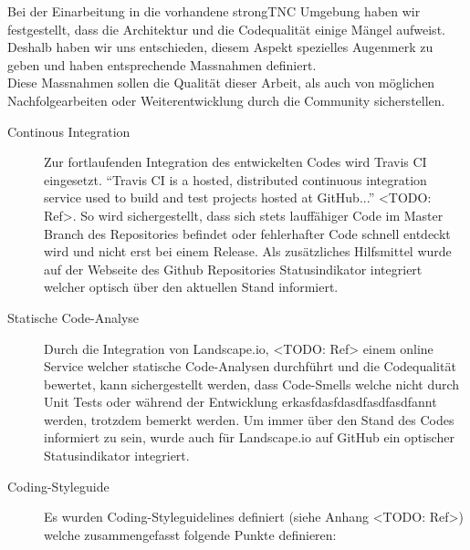 Bei der Einarbeitung in die vorhandene strongTNC Umgebung haben wir
festgestellt, dass die Architektur und die Codequalität einige Mängel aufweist.
Deshalb haben wir uns entschieden, diesem Aspekt spezielles Augenmerk zu geben
und haben entsprechende Massnahmen definiert.\\ 
Diese Massnahmen sollen die Qualität dieser Arbeit, als auch von möglichen
Nachfolgearbeiten oder Weiterentwicklung durch die Community sicherstellen.

\begin{description}
	\item[Continous Integration] Zur fortlaufenden Integration des entwickelten
	Codes wird Travis CI eingesetzt. \enquote{Travis CI is a hosted, distributed
	continuous integration service used to build and test projects hosted at
	GitHub...} <TODO: Ref>. So wird sichergestellt, dass sich stets lauffähiger Code
	im Master Branch des Repositories befindet oder fehlerhafter Code schnell
	entdeckt wird und nicht erst bei einem Release. Als zusätzliches Hilfsmittel
	wurde auf der Webseite des Github Repositories Statusindikator integriert
	welcher optisch über den aktuellen Stand informiert.

	\item[Statische Code-Analyse] Durch die Integration von Landscape.io, <TODO:
	Ref> einem online Service welcher statische Code-Analysen durchführt und die
	Codequalität bewertet, kann sichergestellt werden, dass Code-Smells welche
	nicht durch Unit Tests oder während der Entwicklung erkasfdasfdasdfasdfasdfannt
	werden, trotzdem bemerkt werden. Um immer über den Stand des Codes informiert
	zu sein, wurde auch für Landscape.io auf GitHub ein optischer Statusindikator
	integriert.

	\item[Coding-Styleguide] Es wurden Coding-Styleguidelines definiert (siehe
	Anhang <TODO: Ref>) welche zusammengefasst folgende Punkte definieren: 


\end{description}
